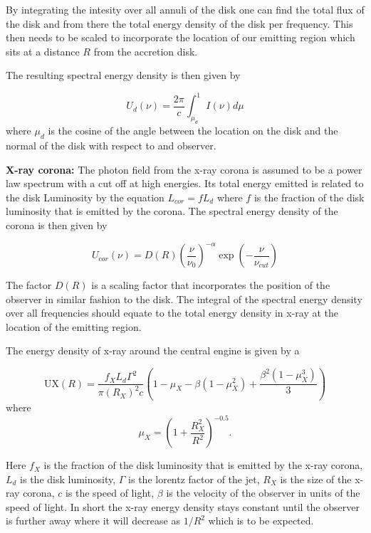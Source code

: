 By integrating the intesity over all annuli of the disk one can find the total flux of the disk and from there the total energy density of the disk per frequency.
This then needs to be scaled to incorporate the location of our emitting region which sits at a distance $R$ from the accretion disk. 

The resulting spectral energy density is then given by

\begin{equation}
    U_d(\nu) = \frac{2\pi}{c} \int_{\mu_d}^1 I(\nu) d\mu
\end{equation}
where $\mu_d$ is the cosine of the angle between the location on the disk and the normal of the disk with respect to and observer.



\textbf{X-ray corona:} The photon field from the x-ray corona is assumed to be a power law spectrum with a cut off at high energies. Its total energy emitted is related to the disk Luminosity 
by the equation $L_{cor} = f L_d$ where $f$ is the fraction of the disk luminosity that is emitted by the corona. The spectral energy density of the corona is then given by 

\begin{equation}
    U_{cor}(\nu) = D(R)\left(\frac{\nu}{\nu_0}\right)^{-\alpha} \exp\left(-\frac{\nu}{\nu_{cut}}\right)
\end{equation}

The factor $D(R)$ is a scaling factor that incorporates the position of the observer in similar fashion to the disk. The integral of the spectral energy density over all frequencies should equate to the total energy density in x-ray at the location of the emitting region.

The energy density of x-ray around the central engine is given by a 

\begin{equation}
    \text{UX}(R) = \frac{f_{X} L_{d} \Gamma^2}{\pi (R_{X})^2 c} \left(1 - \mu_{X} - \beta(1 - \mu_{X}^2) + \frac{\beta^2 (1 - \mu_{X}^3)}{3}\right)
\end{equation}
where
\[
\mu_{X} = \left(1 + \frac{R_{X}^2}{R^2}\right)^{-0.5}.
\]

Here $f_{X}$ is the fraction of the disk luminosity that is emitted by the x-ray corona, $L_{d}$ is the disk luminosity, $\Gamma$ is the lorentz factor of the jet, $R_{X}$ is the size of the x-ray corona, $c$ is the speed of light, $\beta$ is the velocity of the observer in units of the speed of light.
In short the x-ray energy density stays constant until the observer is further away where it will decrease as $1/R^2$ which is to be expected.




